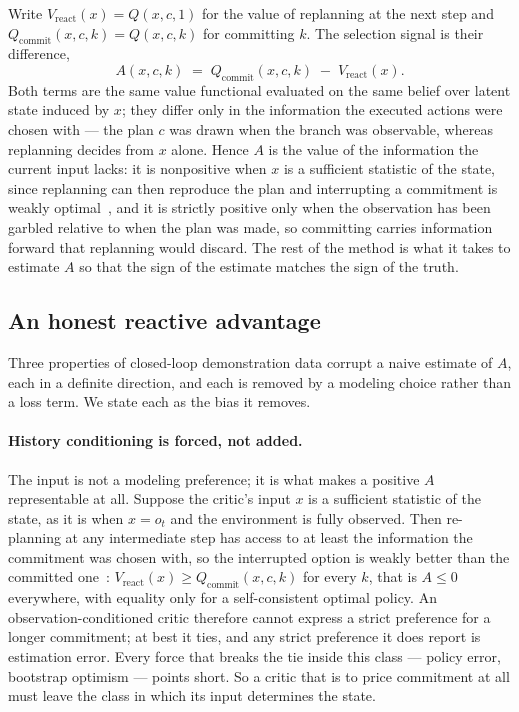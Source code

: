 Write $V_{\mathrm{react}}(x)=Q(x,c,1)$ for the value of replanning at the next step and
$Q_{\mathrm{commit}}(x,c,k)=Q(x,c,k)$ for committing $k$. The selection signal is their difference,
\begin{equation}
\label{eq:rcv-advantage}
A(x,c,k) \;=\; Q_{\mathrm{commit}}(x,c,k) \;-\; V_{\mathrm{react}}(x).
\end{equation}
Both terms are the same value functional evaluated on the same belief over latent state induced by
$x$; they differ only in the information the executed actions were chosen with --- the plan $c$ was
drawn when the branch was observable, whereas replanning decides from $x$ alone. Hence $A$ is the
value of the information the current input lacks: it is nonpositive when $x$ is a sufficient statistic
of the state, since replanning can then reproduce the plan and interrupting a commitment is weakly
optimal~\citep{sutton1999options}, and it is strictly positive only when the observation has been
garbled relative to when the plan was made, so committing carries information forward that replanning
would discard. The rest of the method is what it takes to estimate $A$ so that the sign of the
estimate matches the sign of the truth.

\subsection{An honest reactive advantage}
\label{sec:method:critic}

Three properties of closed-loop demonstration data corrupt a naive estimate of $A$, each in a definite
direction, and each is removed by a modeling choice rather than a loss term. We state each as the bias
it removes.

\paragraph{History conditioning is forced, not added.}
The input is not a modeling preference; it is what makes a positive $A$ representable at all. Suppose
the critic's input $x$ is a sufficient statistic of the state, as it is when $x=o_t$ and the
environment is fully observed. Then re-planning at any intermediate step has access to at least the
information the commitment was chosen with, so the interrupted option is weakly better than the
committed one~\citep{sutton1999options}: $V_{\mathrm{react}}(x)\ge Q_{\mathrm{commit}}(x,c,k)$ for every
$k$, that is $A\le 0$ everywhere, with equality only for a self-consistent optimal policy. An
observation-conditioned critic therefore cannot express a strict preference for a longer commitment; at
best it ties, and any strict preference it does report is estimation error. Every force that breaks the
tie inside this class --- policy error, bootstrap optimism --- points short. So a critic that is to
price commitment at all must leave the class in which its input determines the state.

